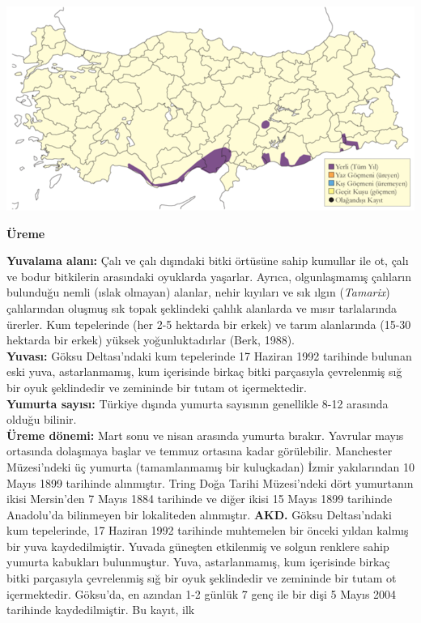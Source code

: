 \documentclass[
  a4paper,
  DIV=11,
  numbers=noendperiod]{scrreprt}
\begin{document}
\includegraphics{images/harita_Page_041.png}

\textbf{Üreme}

\textbf{Yuvalama alanı:} Çalı ve çalı dışındaki bitki örtüsüne sahip
kumullar ile ot, çalı ve bodur bitkilerin arasındaki oyuklarda yaşarlar.
Ayrıca, olgunlaşmamış çalıların bulunduğu nemli (ıslak olmayan) alanlar,
nehir kıyıları ve sık ılgın (\emph{Tamarix}) çalılarından oluşmuş sık
topak şeklindeki çalılık alanlarda ve mısır tarlalarında ürerler. Kum
tepelerinde (her 2-5 hektarda bir erkek) ve tarım alanlarında (15-30
hektarda bir erkek) yüksek yoğunluktadırlar (Berk, 1988).\\
\textbf{Yuvası:} Göksu Deltası'ndaki kum tepelerinde 17 Haziran 1992
tarihinde bulunan eski yuva, astarlanmamış, kum içerisinde birkaç bitki
parçasıyla çevrelenmiş sığ bir oyuk şeklindedir ve zemininde bir tutam
ot içermektedir.\\
\textbf{Yumurta sayısı:} Türkiye dışında yumurta sayısının genellikle
8-12 arasında olduğu bilinir.\\
\textbf{Üreme dönemi:} Mart sonu ve nisan arasında yumurta bırakır.
Yavrular mayıs ortasında dolaşmaya başlar ve temmuz ortasına kadar
görülebilir. Manchester Müzesi'ndeki üç yumurta (tamamlanmamış bir
kuluçkadan) İzmir yakılarından 10 Mayıs 1899 tarihinde alınmıştır. Tring
Doğa Tarihi Müzesi'ndeki dört yumurtanın ikisi Mersin'den 7 Mayıs 1884
tarihinde ve diğer ikisi 15 Mayıs 1899 tarihinde Anadolu'da bilinmeyen
bir lokaliteden alınmıştır. \textbf{AKD.} Göksu Deltası'ndaki kum
tepelerinde, 17 Haziran 1992 tarihinde muhtemelen bir önceki yıldan
kalmış bir yuva kaydedilmiştir. Yuvada güneşten etkilenmiş ve solgun
renklere sahip yumurta kabukları bulunmuştur. Yuva, astarlanmamış, kum
içerisinde birkaç bitki parçasıyla çevrelenmiş sığ bir oyuk şeklindedir
ve zemininde bir tutam ot içermektedir. Göksu'da, en azından 1-2 günlük
7 genç ile bir dişi 5 Mayıs 2004 tarihinde kaydedilmiştir. Bu kayıt, ilk
\end{document}
